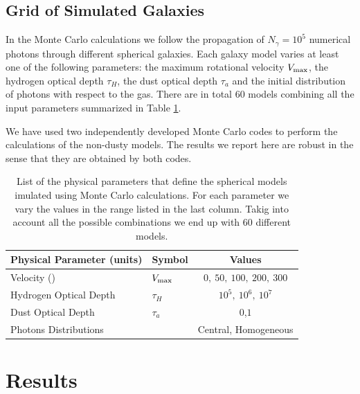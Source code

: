 \documentclass[usenatbib]{mn2e}
\newcommand{\kms}{{\ifmmode{{\mathrm{\,km\ s}^{-1}}}\else{\,km~s$^{-1}$}\fi}}
\begin{document}
\subsection{Grid of Simulated Galaxies}
\label{sec:models}

In the Monte Carlo calculations we follow the propagation of $N_{\gamma}=10^5$
numerical photons through different spherical galaxies. Each galaxy
model varies at least one of the following parameters: the maximum
rotational velocity $V_{\rm max}$, the hydrogen optical depth $\tau_{H}$,
the dust optical depth $\tau_{a}$ and the initial distribution of photons
with respect to the gas. There are in total 60 models combining all
the input parameters summarized in Table \ref{table:models}. 


We have used two independently developed Monte Carlo codes
\citep{CLARA,DijkstraKramer} to perform the calculations of the
non-dusty models. The results we report here are robust in the sense
that they are obtained by both codes.

\begin{table}
\begin{center}
\begin{tabular}{llc}\hline\hline
Physical Parameter (units) & Symbol & Values\\\hline
Velocity (\kms) & $V_{\rm max}$&$0,\ 50,\ 100,\ 200,\ 300$\\
Hydrogen Optical Depth & $\tau_{H} $ & $10^{5},\ 10^{6},\ 10^{7}$\\
Dust Optical Depth & $\tau_{a}$ & $0$,$1$\\
Photons Distributions & & Central, Homogeneous\\\hline\hline
\end{tabular}
\caption{
  List of the physical parameters that define the spherical models 
  imulated using Monte Carlo calculations. For each parameter we
  vary the values in the range listed in the last column. Takig into
  account all the possible combinations we end up with $60$ different
  models. } 
\label{table:models}
\end{center}
\end{table}


\section{Results}
\label{sec:results}
\end{document}

